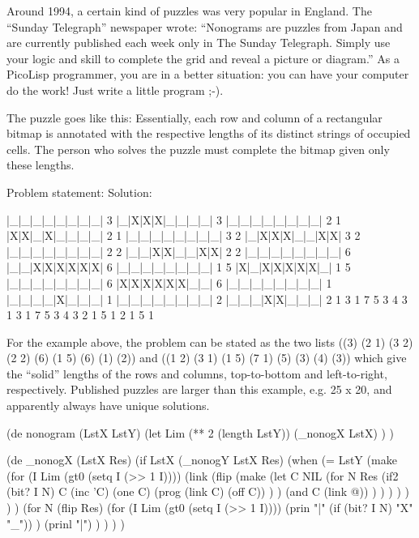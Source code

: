 Around 1994, a certain kind of puzzles was very popular in England. The
``Sunday Telegraph'' newspaper wrote: ``Nonograms are puzzles from Japan
and are currently published each week only in The Sunday Telegraph.
Simply use your logic and skill to complete the grid and reveal a
picture or diagram.'' As a PicoLisp programmer, you are in a better
situation: you can have your computer do the work! Just write a little
program ;-).

 The puzzle goes like this: Essentially, each row and
column of a rectangular bitmap is annotated with the respective lengths
of its distinct strings of occupied cells. The person who solves the
puzzle must complete the bitmap given only these lengths.

\begin{wideverbatim}
   Problem statement:          Solution:

   |_|_|_|_|_|_|_|_| 3         |_|X|X|X|_|_|_|_| 3
   |_|_|_|_|_|_|_|_| 2 1       |X|X|_|X|_|_|_|_| 2 1
   |_|_|_|_|_|_|_|_| 3 2       |_|X|X|X|_|_|X|X| 3 2
   |_|_|_|_|_|_|_|_| 2 2       |_|_|X|X|_|_|X|X| 2 2
   |_|_|_|_|_|_|_|_| 6         |_|_|X|X|X|X|X|X| 6
   |_|_|_|_|_|_|_|_| 1 5       |X|_|X|X|X|X|X|_| 1 5
   |_|_|_|_|_|_|_|_| 6         |X|X|X|X|X|X|_|_| 6
   |_|_|_|_|_|_|_|_| 1         |_|_|_|_|X|_|_|_| 1
   |_|_|_|_|_|_|_|_| 2         |_|_|_|X|X|_|_|_| 2
   1 3 1 7 5 3 4 3             1 3 1 7 5 3 4 3
   2 1 5 1                     2 1 5 1
\end{wideverbatim}             

For the example above, the problem can be stated as the two lists ((3)
(2 1) (3 2) (2 2) (6) (1 5) (6) (1) (2)) and ((1 2) (3 1) (1 5) (7 1)
(5) (3) (4) (3)) which give the ``solid'' lengths of the rows and
columns, top-to-bottom and left-to-right, respectively. Published
puzzles are larger than this example, e.g. 25 x 20, and apparently
always have unique solutions.


\begin{wideverbatim}

(de nonogram (LstX LstY)
   (let Lim (** 2 (length LstY))
      (_nonogX LstX) ) )

(de _nonogX (LstX Res)
   (if LstX
      (_nonogY LstX Res)
      (when
         (= LstY
            (make
               (for (I Lim (gt0 (setq I (>> 1 I))))
                  (link
                     (flip
                        (make
                           (let C NIL
                              (for N Res
                                 (if2 (bit? I N) C
                                    (inc 'C)
                                    (one C)
                                    (prog (link C) (off C)) ) )
                              (and C (link @)) ) ) ) ) ) ) )
         (for N (flip Res)
            (for (I Lim (gt0 (setq I (>> 1 I))))
               (prin "|" (if (bit? I N) "X" "_")) )
            (prinl "|") ) ) ) )


\end{wideverbatim}

